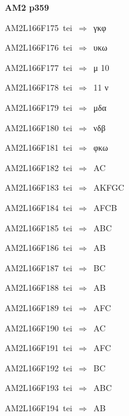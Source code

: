 \par\vfill\eject
{\bf\hfill AM2 p359\hfill\hbox{}}\par\bigskip
{\sixrm AM2L166F175\ {\sixit tei}\ }$\Rightarrow$\ γκφ\par\smallskip
{\sixrm AM2L166F176\ {\sixit tei}\ }$\Rightarrow$\ υκω\par\smallskip
{\sixrm AM2L166F177\ {\sixit tei}\ }$\Rightarrow$\ μ  10\par\smallskip
{\sixrm AM2L166F178\ {\sixit tei}\ }$\Rightarrow$\ 11  ν\par\smallskip
{\sixrm AM2L166F179\ {\sixit tei}\ }$\Rightarrow$\ μδα\par\smallskip
{\sixrm AM2L166F180\ {\sixit tei}\ }$\Rightarrow$\ νδβ\par\smallskip
{\sixrm AM2L166F181\ {\sixit tei}\ }$\Rightarrow$\ φκω\par\smallskip
{\sixrm AM2L166F182\ {\sixit tei}\ }$\Rightarrow$\ AC\par\smallskip
{\sixrm AM2L166F183\ {\sixit tei}\ }$\Rightarrow$\ AKFGC\par\smallskip
{\sixrm AM2L166F184\ {\sixit tei}\ }$\Rightarrow$\ AFCB\par\smallskip
{\sixrm AM2L166F185\ {\sixit tei}\ }$\Rightarrow$\ ABC\par\smallskip
{\sixrm AM2L166F186\ {\sixit tei}\ }$\Rightarrow$\ AB\par\smallskip
{\sixrm AM2L166F187\ {\sixit tei}\ }$\Rightarrow$\ BC\par\smallskip
{\sixrm AM2L166F188\ {\sixit tei}\ }$\Rightarrow$\ AB\par\smallskip
{\sixrm AM2L166F189\ {\sixit tei}\ }$\Rightarrow$\ AFC\par\smallskip
{\sixrm AM2L166F190\ {\sixit tei}\ }$\Rightarrow$\ AC\par\smallskip
{\sixrm AM2L166F191\ {\sixit tei}\ }$\Rightarrow$\ AFC\par\smallskip
{\sixrm AM2L166F192\ {\sixit tei}\ }$\Rightarrow$\ BC\par\smallskip
{\sixrm AM2L166F193\ {\sixit tei}\ }$\Rightarrow$\ ABC\par\smallskip
{\sixrm AM2L166F194\ {\sixit tei}\ }$\Rightarrow$\ AB\par\smallskip

